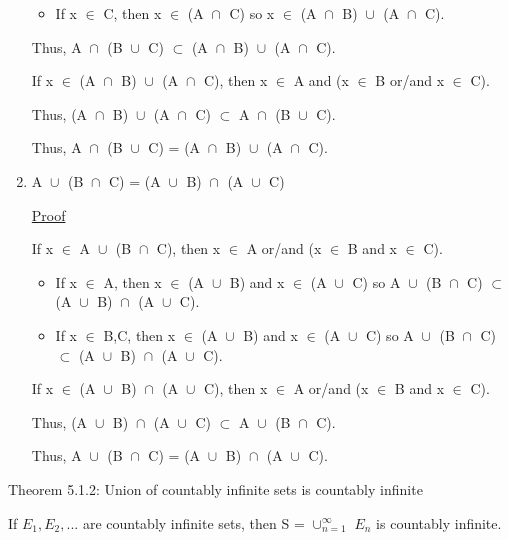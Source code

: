 \begin{enumerate}[label=(\alph*), leftmargin=2cm, itemsep=0.4em]
\begin{itemize}[leftmargin=1cm, itemsep=0.4em]
					\item If x $\in$ C, then x $\in$ (A $\cap_{}^{}$ C) so
						x $\in$ (A $\cap_{}^{}$ B) $\cup_{}^{}$ (A $\cap_{}^{}$ C).
				\end{itemize}
				Thus, A $\cap_{}^{}$ (B $\cup_{}^{}$ C)
				$\subset$ (A $\cap_{}^{}$ B) $\cup_{}^{}$ (A $\cap_{}^{}$ C).
				
				If x $\in$ (A $\cap_{}^{}$ B) $\cup_{}^{}$ (A $\cap_{}^{}$ C),
				then x $\in$ A and (x $\in$ B or/and x $\in$ C).

				Thus, (A $\cap_{}^{}$ B) $\cup_{}^{}$ (A $\cap_{}^{}$ C)
				$\subset$ A $\cap_{}^{}$ (B $\cup_{}^{}$ C).

				Thus, A $\cap_{}^{}$ (B $\cup_{}^{}$ C)
				= (A $\cap_{}^{}$ B) $\cup_{}^{}$ (A $\cap_{}^{}$ C).

		\item A $\cup_{}^{}$ (B $\cap_{}^{}$ C) = (A $\cup_{}^{}$ B) $\cap_{}^{}$ (A $\cup_{}^{}$ C)

			{ \color{magenta} \underline{Proof} } 
			
			If x $\in$ A $\cup_{}^{}$ (B $\cap_{}^{}$ C), then
			x $\in$ A or/and (x $\in$ B and x $\in$ C).
			\begin{itemize}[leftmargin=1cm, itemsep=0.4em]
				\item If x $\in$ A, then x $\in$ (A $\cup_{}^{}$ B)
					and x $\in$ (A $\cup_{}^{}$ C)
					so A $\cup_{}^{}$ (B $\cap_{}^{}$ C) $\subset$
					(A $\cup_{}^{}$ B) $\cap_{}^{}$ (A $\cup_{}^{}$ C).

				\item If x $\in$ B,C, then x $\in$ (A $\cup_{}^{}$ B)
					and x $\in$ (A $\cup_{}^{}$ C)
					so A $\cup_{}^{}$ (B $\cap_{}^{}$ C) $\subset$
					(A $\cup_{}^{}$ B) $\cap_{}^{}$ (A $\cup_{}^{}$ C).
			\end{itemize}
			If x $\in$ (A $\cup_{}^{}$ B) $\cap_{}^{}$ (A $\cup_{}^{}$ C), then
			x $\in$ A or/and (x $\in$ B and x $\in$ C).

			Thus, (A $\cup_{}^{}$ B) $\cap_{}^{}$ (A $\cup_{}^{}$ C)
			$\subset$ A $\cup_{}^{}$ (B $\cap_{}^{}$ C).

			Thus, A $\cup_{}^{}$ (B $\cap_{}^{}$ C)
			= (A $\cup_{}^{}$ B) $\cap_{}^{}$ (A $\cup_{}^{}$ C).
	\end{enumerate}

\newpage

{ \color{red} Theorem 5.1.2: Union of countably infinite sets is countably infinite } 

	\begin{adjustbox}{minipage=14cm, right, vspace=0.1cm 0cm}
		If $E_1, E_2, ... $ are countably infinite sets, then S = $\cup_{n=1}^{\infty}$ $E_n$
		is countably infinite.
	\end{adjustbox}

